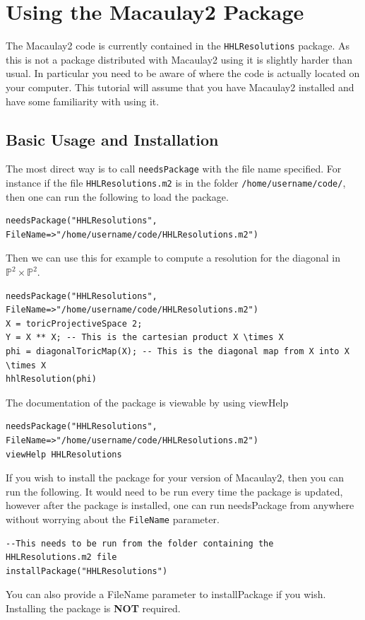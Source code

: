 \documentclass{amsart}
\begin{document}
\fi

\section{Using the Macaulay2 Package}

The Macaulay2 code is currently contained in the \texttt{HHLResolutions} package. As this is not a package distributed with Macaulay2 using it is slightly harder than usual. In particular you need to be aware of where the code is actually located on your computer. This tutorial will assume that you have Macaulay2 installed and have some familiarity with using it. %

\subsection{Basic Usage and Installation}
The most direct way is to call \verb|needsPackage| with the file name specified. For instance if the file \verb|HHLResolutions.m2| is in the folder \verb|/home/username/code/|, then one can run the following to load the package.

\begin{verbatim}
needsPackage("HHLResolutions", FileName=>"/home/username/code/HHLResolutions.m2")
\end{verbatim}

Then we can use this for example to compute a resolution for the diagonal in $\mathbb{P}^2\times \mathbb{P}^2$.

\begin{verbatim}
needsPackage("HHLResolutions", FileName=>"/home/username/code/HHLResolutions.m2")
X = toricProjectiveSpace 2;
Y = X ** X; -- This is the cartesian product X \times X
phi = diagonalToricMap(X); -- This is the diagonal map from X into X \times X
hhlResolution(phi)
\end{verbatim}

The documentation of the package is viewable by using viewHelp
\begin{verbatim}
needsPackage("HHLResolutions", FileName=>"/home/username/code/HHLResolutions.m2")
viewHelp HHLResolutions
\end{verbatim}

If you wish to install the package for your version of Macaulay2, then you can run the following. It would need to be run every time the package is updated, however after the package is installed, one can run needsPackage from anywhere without worrying about the \verb|FileName| parameter.
\begin{verbatim}
--This needs to be run from the folder containing the HHLResolutions.m2 file
installPackage("HHLResolutions")
\end{verbatim}
You can also provide a FileName parameter to installPackage if you wish. Installing the package is \textbf{NOT} required.
\end{document}
